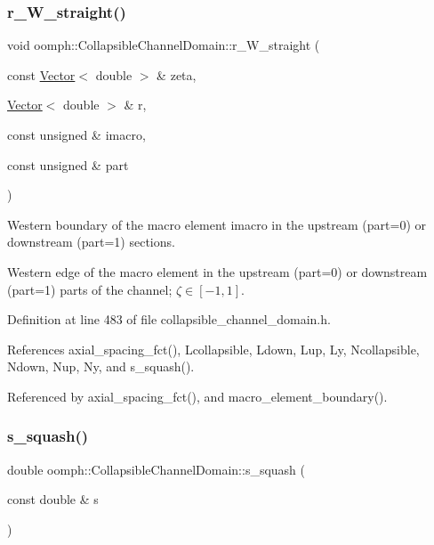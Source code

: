 \subsubsection{\texorpdfstring{r\+\_\+\+W\+\_\+straight()}{r\_W\_straight()}}
{\footnotesize\ttfamily void oomph\+::\+Collapsible\+Channel\+Domain\+::r\+\_\+\+W\+\_\+straight (\begin{DoxyParamCaption}\item[{const \hyperlink{classoomph_1_1Vector}{Vector}$<$ double $>$ \&}]{zeta,  }\item[{\hyperlink{classoomph_1_1Vector}{Vector}$<$ double $>$ \&}]{r,  }\item[{const unsigned \&}]{imacro,  }\item[{const unsigned \&}]{part }\end{DoxyParamCaption})\hspace{0.3cm}{\ttfamily [private]}}



Western boundary of the macro element imacro in the upstream (part=0) or downstream (part=1) sections. 

Western edge of the macro element in the upstream (part=0) or downstream (part=1) parts of the channel; $ \zeta \in [-1,1] $. 

Definition at line 483 of file collapsible\+\_\+channel\+\_\+domain.\+h.



References axial\+\_\+spacing\+\_\+fct(), Lcollapsible, Ldown, Lup, Ly, Ncollapsible, Ndown, Nup, Ny, and s\+\_\+squash().



Referenced by axial\+\_\+spacing\+\_\+fct(), and macro\+\_\+element\+\_\+boundary().

\mbox{\label{classoomph_1_1CollapsibleChannelDomain_a638fd3959b72ef3287615f2b0f968e33}} 
\subsubsection{\texorpdfstring{s\+\_\+squash()}{s\_squash()}}
{\footnotesize\ttfamily double oomph\+::\+Collapsible\+Channel\+Domain\+::s\+\_\+squash (\begin{DoxyParamCaption}\item[{const double \&}]{s }\end{DoxyParamCaption})\hspace{0.3cm}{\ttfamily [inline]}}



